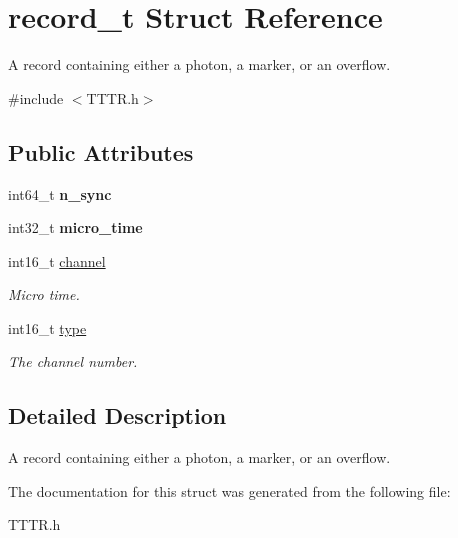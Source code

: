 \hypertarget{structrecord__t}{}\section{record\+\_\+t Struct Reference}
\label{structrecord__t}


A record containing either a photon, a marker, or an overflow.  




{\ttfamily \#include $<$T\+T\+T\+R.\+h$>$}

\subsection*{Public Attributes}
\begin{DoxyCompactItemize}
\item 
\mbox{\label{structrecord__t_ae8c3ee18ae9783c9a2e129b6e88e0e53}} 
int64\+\_\+t {\bfseries n\+\_\+sync}
\item 
\mbox{\label{structrecord__t_a2068f247dce9f0e164d1195e1a92aa7a}} 
int32\+\_\+t {\bfseries micro\+\_\+time}
\item 
\mbox{\label{structrecord__t_aebb2cbdd449219d261e177677b40ec97}} 
int16\+\_\+t \hyperlink{structrecord__t_aebb2cbdd449219d261e177677b40ec97}{channel}
\begin{DoxyCompactList}\small\item\em Micro time. \end{DoxyCompactList}\item 
\mbox{\label{structrecord__t_a1029e1f4834b4d7467e40425beb4f7e8}} 
int16\+\_\+t \hyperlink{structrecord__t_a1029e1f4834b4d7467e40425beb4f7e8}{type}
\begin{DoxyCompactList}\small\item\em The channel number. \end{DoxyCompactList}\end{DoxyCompactItemize}


\subsection{Detailed Description}
A record containing either a photon, a marker, or an overflow. 

The documentation for this struct was generated from the following file\+:\begin{DoxyCompactItemize}
\item 
T\+T\+T\+R.\+h\end{DoxyCompactItemize}
